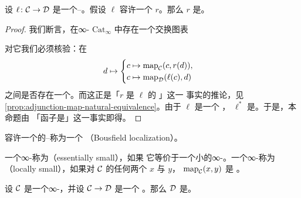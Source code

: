 \begin{proposition}\label{prop:bousfield-right-adjoint-ff}
设 $\ell\colon \mathcal{C} \to \mathcal{D}$ 是一个\trDwyer{}--\trKan{}\trLocalization{}。假设
$\ell$ 容许一个\trRightAdjoint{} $r$。那么 $r$ 是\trFullyFaithful{}。
\end{proposition}

\begin{proof}
我们断言，在∞-\trCategory{} $\mathrm{Cat}_{\infty}$ 中存在一个交换图表
\begin{center}
\end{center}
对它我们必须核验：在\trFunctor{}%
\[
d \mapsto
\begin{cases}
c \mapsto \mathrm{map}_{\mathcal{C}}(c, r(d)), \\
c \mapsto \mathrm{map}_{\mathcal{D}}(\ell(c), d)
\end{cases}
\]
之间是否存在一个\trNaturalEquivalence{}。而这正是「$r$ 是 $\ell$ 的%
\trRightAdjoint{}」这一
事实的推论，见\cref{prop:adjunction-map-natural-equivalence}。由于 $\ell$ 是一个%
\trLocalization{}，\trFunctor{} $\ell^*$ 是\trFullyFaithful{}。于是，本命题由
「\trYoneda{}函子是\trFullyFaithful{}」这一事实即得。
\end{proof}

\begin{definition}\label{def:bousfield-localization}
容许一个\trRightAdjoint{}的\trDwyer{}--\trKan{}\trLocalization{}称为一个%
\emph{\trBousfield{}\trLocalization{}}（Bousfield localization）。
\end{definition}

\begin{definition}\label{def:essentially-locally-small}
一个∞-\trCategory{}称为\emph{\trEssentiallySmall{}}（essentially small），如果
它等价于一个小的∞-\trCategory{}。一个∞-\trCategory{}称为%
\emph{\trLocallySmall{}}（locally small），如果对 $\mathcal{C}$ 的任何两个\trObject{}%
$x$ 与 $y$，\trMappingSpace{} $\mathrm{map}_{\mathcal{C}}(x, y)$ 是%
\trEssentiallySmall{}。
\end{definition}

\begin{corollary}\label{cor:bousfield-locally-small}
设 $\mathcal{C}$ 是一个\trLocallySmall{}∞-\trCategory{}，并设 $\mathcal{C} \to \mathcal{D}$ 是一个%
\trBousfield{}\trLocalization{}。那么 $\mathcal{D}$ 是\trLocallySmall{}。
\end{corollary}

